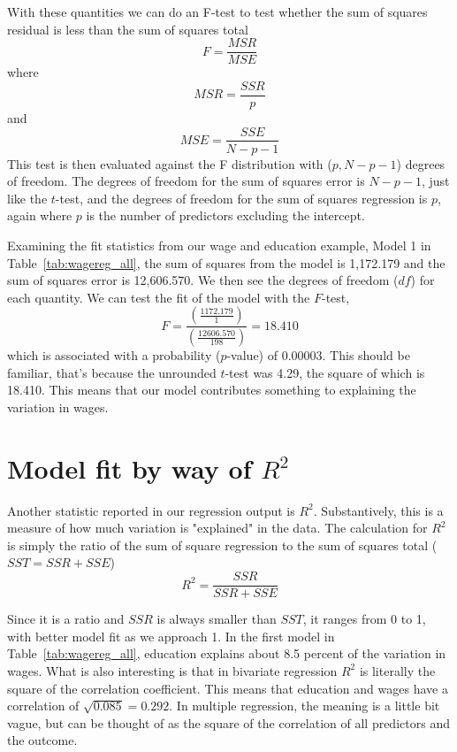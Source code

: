 With these quantities we can do an F-test to test whether the sum of squares residual is less than the sum of squares total
\begin{equation}
F=\frac{MSR}{MSE}
\end{equation}
where
\begin{equation}
MSR = \frac{SSR}{p}
\end{equation}
and
\begin{equation}
MSE = \frac{SSE}{N-p-1}
\end{equation}
This test is then evaluated against the F distribution with ($p, N-p-1$) degrees of freedom. The degrees of freedom for the sum of squares error is $N-p-1$, just like the $t$-test, and the degrees of freedom for the sum of squares regression is $p$, again where $p$ is the number of predictors excluding the intercept.

Examining the fit statistics from our wage and education example, Model 1 in Table~\ref{tab:wagereg_all}, the sum of squares from the model is 1,172.179 and the sum of squares error is 12,606.570. We then see the degrees of freedom ($df$) for each quantity. We can test the fit of the model with the $F$-test,
\[
F=\frac{\left(\frac{1172.179}{1}\right)}{\left(\frac{12606.570}{198}\right)}=18.410
\]
which is associated with a probability ($p$-value) of 0.00003. This should be familiar, that's because the unrounded $t$-test was 4.29, the square of which is 18.410. This means that our model contributes something to explaining the variation in wages.
\section{Model fit by way of $R^2$}
Another statistic reported in our regression output is $R^2$. Substantively, this is a measure of how much variation is "explained" in the data. The calculation for $R^2$ is simply the ratio of the sum of square regression to the sum of squares total ($SST = SSR + SSE$)
\begin{equation}
R^2 = \frac{SSR}{SSR+SSE}
\end{equation}

Since it is a ratio and $SSR$ is always smaller than $SST$, it ranges from 0 to 1, with better model fit as we approach 1. In the first model in Table~\ref{tab:wagereg_all}, education explains about 8.5 percent of the variation in wages. What is also interesting is that in bivariate regression $R^2$ is literally the square of the correlation coefficient. This means that education and wages have a correlation of $\sqrt{0.085} = 0.292$. In multiple regression, the meaning is a little bit vague, but can be thought of as the square of the correlation of all predictors and the outcome.

